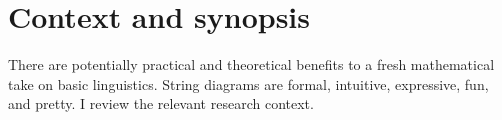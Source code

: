 \chapter{Context and synopsis}
There are potentially practical and theoretical benefits to a fresh mathematical take on basic linguistics. String diagrams are formal, intuitive, expressive, fun, and pretty. I review the relevant research context.
\newpage
\label{sec:proctheory}
\newpage












